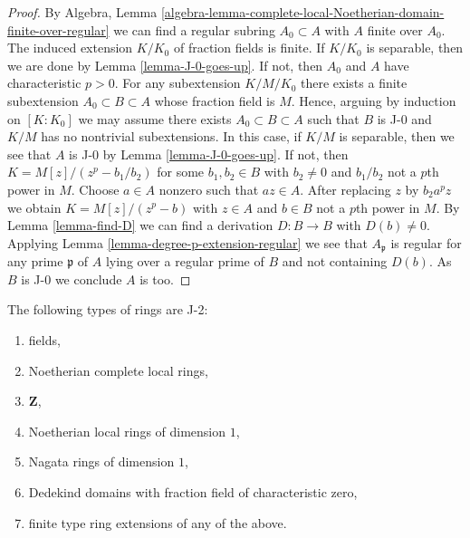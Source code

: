 \begin{proof}
By Algebra, Lemma
\ref{algebra-lemma-complete-local-Noetherian-domain-finite-over-regular}
we can find a regular subring $A_0 \subset A$ with $A$ finite over $A_0$.
The induced extension $K/K_0$ of fraction fields is finite.
If $K/K_0$ is separable, then we are done by
Lemma \ref{lemma-J-0-goes-up}. If not, then $A_0$ and $A$
have characteristic $p > 0$. For any subextension $K/M/K_0$
there exists a finite subextension $A_0 \subset B \subset A$
whose fraction field is $M$. Hence, arguing by induction on
$[K : K_0]$ we may assume there exists $A_0 \subset B \subset A$ such that
$B$ is J-0 and $K/M$ has no nontrivial subextensions.
In this case, if $K/M$ is separable, then we
see that $A$ is J-0 by Lemma \ref{lemma-J-0-goes-up}.
If not, then $K = M[z]/(z^p - b_1/b_2)$ for some $b_1, b_2 \in B$
with $b_2 \not = 0$ and $b_1/b_2$ not a $p$th power in $M$.
Choose $a \in A$ nonzero such that $az \in A$. After replacing
$z$ by $b_2 a^p z$ we obtain $K = M[z]/(z^p - b)$ with
$z \in A$ and $b \in B$ not a $p$th power in $M$.
By Lemma \ref{lemma-find-D}
we can find a derivation $D : B \to B$ with $D(b) \not = 0$.
Applying Lemma \ref{lemma-degree-p-extension-regular}
we see that $A_\mathfrak p$ is regular for any prime
$\mathfrak p$ of $A$ lying over a regular prime of $B$
and not containing $D(b)$. As $B$ is J-0 we conclude $A$ is too.
\end{proof}

\begin{proposition}
\label{proposition-ubiquity-J-2}
The following types of rings are J-2:
\begin{enumerate}
\item fields,
\item Noetherian complete local rings,
\item $\mathbf{Z}$,
\item Noetherian local rings of dimension $1$,
\item Nagata rings of dimension $1$,
\item Dedekind domains with fraction field of characteristic zero,
\item finite type ring extensions of any of the above.
\end{enumerate}
\end{proposition}

